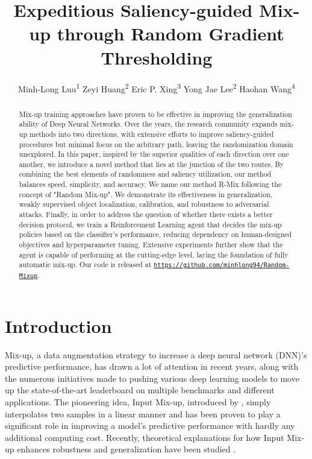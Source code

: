 \documentclass[letterpaper]{article} \usepackage[submission]{aaai23}  \usepackage{times}  \usepackage{helvet}  \usepackage{courier}  \usepackage[hyphens]{url}  \usepackage{graphicx} \urlstyle{rm} \def\UrlFont{\rm}  \usepackage{natbib}  \usepackage{caption} \frenchspacing  \setlength{\pdfpagewidth}{8.5in} \setlength{\pdfpageheight}{11in}
\author{
    Minh-Long Luu\textsuperscript{\rm 1} \quad
    Zeyi Huang\textsuperscript{\rm 2} \quad
    Eric P. Xing\textsuperscript{\rm 3} \quad
    Yong Jae Lee\textsuperscript{\rm 2} \quad
    Haohan Wang\textsuperscript{\rm 4} \quad
}
\title{Expeditious Saliency-guided Mix-up through Random Gradient Thresholding}
\newcommand{\mixup}{Input Mix-up}
\newcommand{\rrlmix}{{R-Mix}}
\begin{document}
\maketitle


\begin{abstract}
Mix-up training approaches have proven to be effective in improving the generalization ability of Deep Neural Networks. Over the years, the research community expands mix-up methods into two directions, with extensive efforts to improve saliency-guided procedures but minimal focus on the arbitrary path, leaving the randomization domain unexplored. In this paper, inspired by the superior qualities of each direction over one another, we introduce a novel method that lies at the junction of the two routes. By combining the best elements of randomness and saliency utilization, our method balances speed, simplicity, and accuracy. We name our method \rrlmix{} following the concept of "Random Mix-up". We demonstrate its effectiveness in generalization, weakly supervised object localization, calibration, and robustness to adversarial attacks. Finally, in order to address the question of whether there exists a better decision protocol, we train a Reinforcement Learning agent that decides the mix-up policies based on the classifier's performance, reducing dependency on human-designed objectives and hyperparameter tuning. Extensive experiments further show that the agent is capable of performing at the cutting-edge level, laying the foundation of fully automatic mix-up. Our code is released at \href{https://github.com/minhlong94/Random-Mixup}{\texttt{https://github.com/minhlong94/Random-Mixup}}. \end{abstract}


\section{Introduction}
\label{sec:intro}

Mix-up, a data augmentation strategy to increase a deep neural network (DNN)'s predictive performance, 
has drawn a lot of attention in recent years, 
along with the numerous initiatives made to 
pushing various deep learning models to move up the state-of-the-art leaderboard
on multiple benchmarks and different applications. 
The pioneering idea, 
\mixup{}, introduced by \cite{zhang2018mixup},
simply interpolates two samples in a linear manner
and has been proven to play a significant role 
in improving a model's predictive performance
with hardly any additional computing cost. Recently, theoretical explanations for how \mixup{} enhances robustness and generalization have been studied \cite{zhang2021howmixup}.
\end{document}
